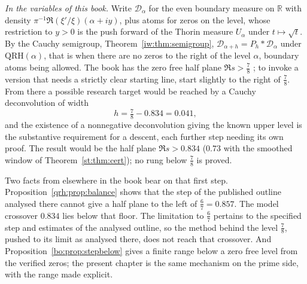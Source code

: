 \emph{In the variables of this book.} Write $\mathcal D_\alpha$ for the even boundary measure on $\mathbb R$ with density $\pi^{-1}\Re(\xi'/\xi)(\alpha+iy)$, plus atoms for zeros on the level, whose restriction to $y>0$ is the push forward of the Thorin measure $U_\alpha$ under $t\mapsto\sqrt t$. By the Cauchy semigroup, Theorem~\ref{iw:thm:semigroup}, $\mathcal D_{\alpha+h}=P_h*\mathcal D_\alpha$ under $\mathrm{QRH}(\alpha)$, that is when there are no zeros to the right of the level $\alpha$, boundary atoms being allowed. The book has the zero free half plane $\Re s>\tfrac78$ \cite{OAI26a}; to invoke a version that needs a strictly clear starting line, start slightly to the right of $\tfrac78$. From there a possible research target would be reached by a Cauchy deconvolution of width
\[
h=\tfrac78-0.834=0.041 ,
\]
and the existence of a nonnegative deconvolution giving the known upper level is the substantive requirement for a descent, each further step needing its own proof. The result would be the half plane $\Re s>0.834$ ($0.73$ with the smoothed window of Theorem~\ref{st:thm:cert}); no rung below $\tfrac78$ is proved.

Two facts from elsewhere in the book bear on that first step. Proposition~\ref{qrh:prop:balance} shows that the step of the published outline analysed there cannot give a half plane to the left of $\tfrac67=0.857$. The model crossover $0.834$ lies below that floor. The limitation to $\tfrac67$ pertains to the specified step and estimates of the analysed outline, so the method behind the level $\tfrac78$, pushed to its limit as analysed there, does not reach that crossover. And Proposition~\ref{bo:prop:stepbelow} gives a finite range below a zero free level from the verified zeros; the present chapter is the same mechanism on the prime side, with the range made explicit.

